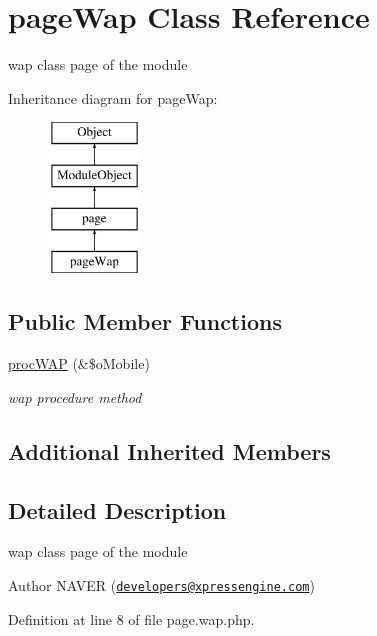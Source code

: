 \hypertarget{classpageWap}{\section{page\-Wap Class Reference}
\label{classpageWap}
}


wap class page of the module  


Inheritance diagram for page\-Wap\-:\begin{figure}[H]
\begin{center}
\leavevmode
\includegraphics[height=4.000000cm]{classpageWap}
\end{center}
\end{figure}
\subsection*{Public Member Functions}
\begin{DoxyCompactItemize}
\item 
\hyperlink{classpageWap_a7ee56942979074bd2b79621dfc7349e9}{proc\-W\-A\-P} (\&\$o\-Mobile)
\begin{DoxyCompactList}\small\item\em wap procedure method \end{DoxyCompactList}\end{DoxyCompactItemize}
\subsection*{Additional Inherited Members}


\subsection{Detailed Description}
wap class page of the module 

\begin{DoxyAuthor}{Author}
N\-A\-V\-E\-R (\href{mailto:developers@xpressengine.com}{\tt developers@xpressengine.\-com}) 
\end{DoxyAuthor}


Definition at line 8 of file page.\-wap.\-php.



